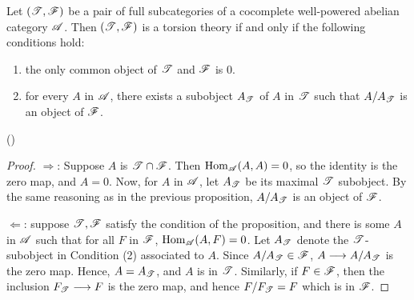 \begin{prop}\label{prop_tt_suff_cond}
Let $(\mathscr{T}, \mathscr{F})$ be a pair of full subcategories of
a cocomplete well-powered abelian category
$\mathscr{A}$. Then $(\mathscr{T}, \mathscr{F})$ is
a torsion theory if and only if the following conditions hold:
\begin{enumerate}
\item the only common object of $\mathscr{T}$ and $\mathscr{F}$ is 0.

\item for every $A$ in $\mathscr{A}$, there exists a subobject 
$A_{\mathscr{T}}$ of $A$ in $\mathscr{T}$ such that $A/A_{\mathscr{T}}$ 
is an object of $\mathscr{F}$.
\end{enumerate}
(\CF \cite[I2.7]{BJV})
\end{prop}
\begin{proof}
\noindent $\Rightarrow$: Suppose $A$ is $\mathscr{T} \cap \mathscr{F}$.
Then $\mathrm{Hom}_{\mathscr{A}}(A,A) = 0$, so the identity is the zero map, and
$A = 0$. Now, for $A$ in $\mathscr{A}$, let $A_{\mathscr{T}}$ be its maximal
$\mathscr{T}$ subobject. By the same reasoning as in the previous
proposition, $A/A_{\mathscr{T}}$ is an object of $\mathscr{F}$.

\vskip 10pt
\noindent $\Leftarrow$: suppose $\mathscr{T}, \mathscr{F}$ satisfy the 
condition of the proposition, and there is some $A$ in $\mathscr{A}$ 
such that for all $F$ in $\mathscr{F}$, $\mathrm{Hom}_{\mathscr{A}}(A, F) = 0$. Let
$A_{\mathscr{T}}$ denote the $\mathscr{T}$-subobject in Condition (2) 
associated to $A$. Since $A/A_{\mathscr{T}} \in \mathscr{F}$, $A \longrightarrow 
A/A_{\mathscr{T}}$ is the zero map. Hence, $A = A_{\mathscr{T}}$, and
$A$ is in $\mathscr{T}$. Similarly, if $F \in \mathscr{F}$, then the 
inclusion $F_{\mathscr{T}} \longrightarrow F$ is the zero map, and hence 
$F/F_{\mathscr{T}} = F$ which is in $\mathscr{F}$.
\end{proof}

